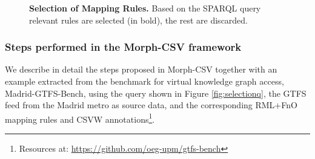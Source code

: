 \begin{figure}[ht]
  \centering
\caption[Selection of mapping rules]{\textbf{Selection of Mapping Rules.} Based on the SPARQL query relevant rules are selected (in bold), the rest are discarded.}
\label{fig:selection}
\end{figure}

\subsubsection{Steps performed in the Morph-CSV framework}
We describe in detail the steps proposed in Morph-CSV together with an example extracted from the benchmark for virtual knowledge graph access, Madrid-GTFS-Bench, using the query shown in Figure \ref{fig:selectionq}, the GTFS feed from the  Madrid metro as source data, and the corresponding RML+FnO mapping rules and CSVW annotations\footnote{Resources at: \url{https://github.com/oeg-upm/gtfs-bench}}.

